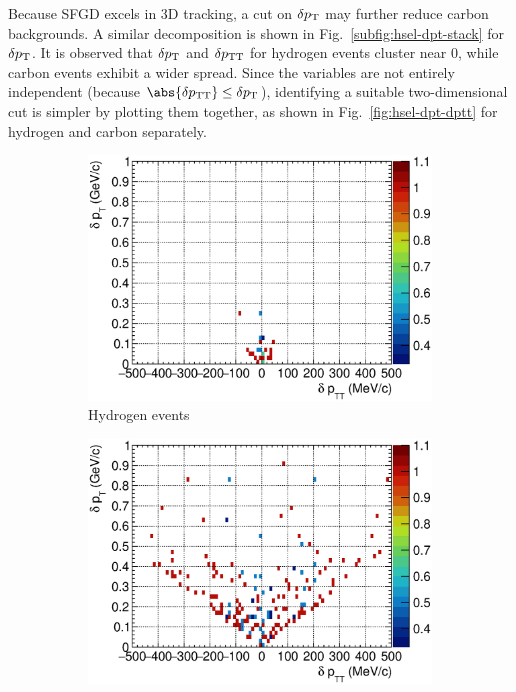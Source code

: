     Because SFGD excels in 3D tracking, a cut on $\delta p_\textrm{T}$ may further reduce carbon backgrounds.
     A similar decomposition is shown in Fig.~\ref{subfig:hsel-dpt-stack} for $\delta p_\textrm{T}$.
     It is observed that $\delta p_\textrm{T}$ and $\delta p_\textrm{TT}$ for hydrogen events cluster near $0$, while carbon events exhibit a wider spread.
     Since the variables are not entirely independent (because $\abs{\dptt} \leq \dpt$), identifying a suitable two-dimensional cut is simpler by plotting them together, as shown in Fig.~\ref{fig:hsel-dpt-dptt} for hydrogen and carbon separately.
     \begin{figure}
          \begin{subfigure}[b]{\dbfigwid\textwidth}
               \centering
               \includegraphics[width=\textwidth]{figures/perf/tki/SFGpTPCmu_dptt_colnor_vs_dpt_hist2d_al15_H.eps}
               \caption{Hydrogen events}
               \label{subfig:hsel-dpt-dptt-h}
          \end{subfigure}
          \begin{subfigure}[b]{\dbfigwid\textwidth}
               \centering
               \includegraphics[width=\textwidth]{figures/perf/tki/SFGpTPCmu_dptt_colnor_vs_dpt_hist2d_al15_C.eps}

\end{subfigure}
\end{figure}
